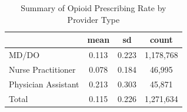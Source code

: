 \begin{table}[htbp]\centering
\def\sym#1{\ifmmode^{#1}\else\(^{#1}\)\fi}
\caption{Summary of Opioid Prescribing Rate by Provider Type}
\begin{tabular}{l*{1}{ccc}}
\toprule
                    &        mean&          sd&       count\\
\midrule
MD/DO               &       0.113&       0.223&   1,178,768\\
Nurse Practitioner  &       0.078&       0.184&      46,995\\
Physician Assistant &       0.213&       0.303&      45,871\\
Total               &       0.115&       0.226&   1,271,634\\
\bottomrule
\end{tabular}
\end{table}

